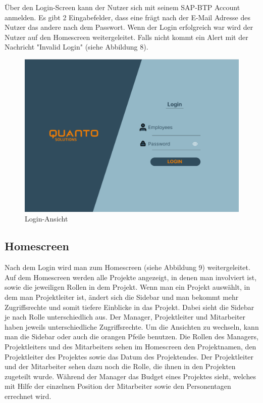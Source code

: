 \documentclass{article}
\begin{document}
    Über den Login-Screen kann der Nutzer sich mit seinem SAP-BTP Account anmelden. Es gibt 2 Eingabefelder, dass eine frägt nach der E-Mail Adresse des Nutzer das andere nach dem Passwort.
    Wenn der Login erfolgreich war wird der Nutzer auf den Homescreen weitergeleitet. Falls nicht kommt ein Alert mit der Nachricht "Invalid Login" (siehe Abbildung 8).


        \begin{figure}[h]
            \includegraphics[height= 0.5\textwidth,width= \textwidth]{images/Login.png}
            \caption{Login-Ansicht}
            \label{fig:beispiel}
        \end{figure}

\subsection{Homescreen}
Nach dem Login wird man zum Homescreen (siehe Abbildung 9) weitergeleitet.  Auf dem Homescreen werden alle Projekte angezeigt, in denen man involviert ist, sowie die jeweiligen Rollen in dem Projekt. Wenn man ein Projekt auswählt, in dem man Projektleiter ist, ändert sich die Sidebar und man bekommt mehr Zugriffsrechte und somit tiefere Einblicke in das Projekt. Dabei sieht die Sidebar je nach Rolle unterschiedlich aus. Der Manager, Projektleiter und Mitarbeiter haben jeweils unterschiedliche Zugriffsrechte. Um die Ansichten zu wechseln, kann man die Sidebar oder auch die orangen Pfeile benutzen. Die Rollen des Managers, Projektleiters und des Mitarbeiters sehen im Homescreen den Projektnamen, den Projektleiter des Projektes sowie das Datum des Projektendes. Der Projektleiter und der Mitarbeiter sehen dazu noch die Rolle, die ihnen in den Projekten zugeteilt wurde. Während der Manager das Budget eines Projektes sieht, welches mit Hilfe der einzelnen Position der Mitarbeiter sowie den Personentagen errechnet wird.
\end{document}
